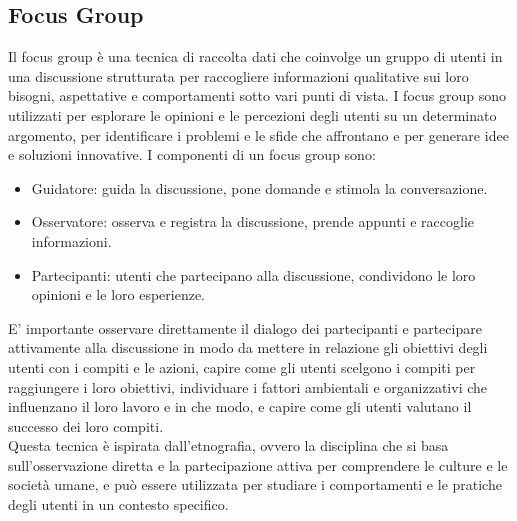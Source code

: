 \documentclass{report}
\begin{document}
	\subsection{Focus Group}
	Il focus group è una tecnica di raccolta dati che coinvolge un gruppo di utenti in una discussione strutturata per raccogliere informazioni qualitative sui loro bisogni, aspettative e comportamenti sotto vari punti di vista. I focus group sono utilizzati per esplorare le opinioni e le percezioni degli utenti su un determinato argomento, per identificare i problemi e le sfide che affrontano e per generare idee e soluzioni innovative.
	I componenti di un focus group sono:
	\begin{itemize}
		\item Guidatore: guida la discussione, pone domande e stimola la conversazione.
		\item Osservatore: osserva e registra la discussione, prende appunti e raccoglie informazioni.
		\item Partecipanti: utenti che partecipano alla discussione, condividono le loro opinioni e le loro esperienze.
	\end{itemize}
	E' importante osservare direttamente il dialogo dei partecipanti e partecipare attivamente alla discussione in modo da mettere in relazione gli obiettivi degli utenti con i compiti e le azioni, capire come gli utenti scelgono i compiti per raggiungere i loro obiettivi, individuare i fattori ambientali e organizzativi che influenzano il loro lavoro e in che modo, e capire come gli utenti valutano il successo dei loro compiti.
	\vspace{\baselineskip}\\
	Questa tecnica è ispirata dall'etnografia, ovvero la disciplina che si basa sull'osservazione diretta e la partecipazione attiva per comprendere le culture e le società umane, e può essere utilizzata per studiare i comportamenti e le pratiche degli utenti in un contesto specifico.
\end{document}
